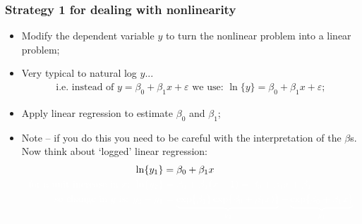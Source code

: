 \documentclass[aspectratio=169]{beamer}
\theoremstyle{principle}
\begin{document}
\begin{frame}
\frametitle{Strategy 1 for dealing with nonlinearity}

\begin{itemize}
\item Modify the dependent variable $y$ to turn the nonlinear problem into a linear problem;
\item Very typical to natural log $y$...
\begin{align*}
\mbox{i.e. instead of }y = \beta_0 + \beta_1x + \varepsilon\mbox{ we use: }\ln\{y\} = \beta_0 + \beta_1x + \varepsilon;
\end{align*}
\item Apply linear regression to estimate $\beta_0$ and $\beta_1$;
\item Note -- if you do this you need to be careful with the interpretation of the $\beta$s.  Now think about `logged' linear regression:
\begin{align*}
\ln\{y_1\} &= \beta_0 + \beta_1x\\
\color{white}\mbox{for a unit increase in $x$: } \ln\{y_2\} &\color{white}= \beta_0 + \beta_1(x + 1) = \beta_0 + \beta_1x + \beta_1\\
\color{white}\mbox{so change in $y$ is: }y_2 - y_1 &\color{white}= \underbrace{\exp\{\beta_1\}\exp\{\beta_0 + \beta_1x)\}}_{y_2} - \underbrace{\exp\{\beta_0 + \beta_1x\}}_{y_1}
\end{align*}

\end{itemize}

\end{frame}
\end{document}
